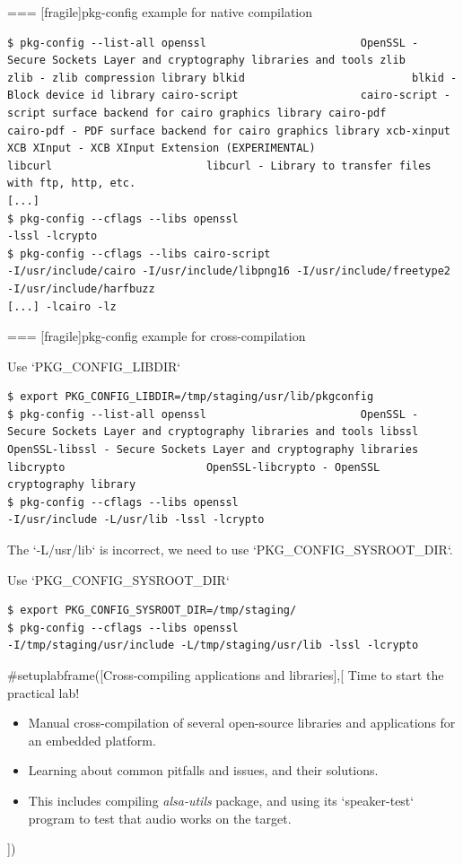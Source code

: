 === [fragile]{pkg-config example for native compilation}
  \begin{block}{}
    {\scriptsize
\begin{verbatim}
$ pkg-config --list-all openssl                        OpenSSL - Secure Sockets Layer and cryptography libraries and tools zlib                           zlib - zlib compression library blkid                          blkid - Block device id library cairo-script                   cairo-script - script surface backend for cairo graphics library cairo-pdf                      cairo-pdf - PDF surface backend for cairo graphics library xcb-xinput                     XCB XInput - XCB XInput Extension (EXPERIMENTAL)
libcurl                        libcurl - Library to transfer files with ftp, http, etc.
[...]
$ pkg-config --cflags --libs openssl
-lssl -lcrypto
$ pkg-config --cflags --libs cairo-script
-I/usr/include/cairo -I/usr/include/libpng16 -I/usr/include/freetype2 -I/usr/include/harfbuzz
[...] -lcairo -lz
\end{verbatim}
    }
  \end{block}


=== [fragile]{pkg-config example for cross-compilation}
  \begin{block}{Use `PKG_CONFIG_LIBDIR`}
    {\scriptsize
\begin{verbatim}
$ export PKG_CONFIG_LIBDIR=/tmp/staging/usr/lib/pkgconfig
$ pkg-config --list-all openssl                        OpenSSL - Secure Sockets Layer and cryptography libraries and tools libssl                         OpenSSL-libssl - Secure Sockets Layer and cryptography libraries libcrypto                      OpenSSL-libcrypto - OpenSSL cryptography library
$ pkg-config --cflags --libs openssl
-I/usr/include -L/usr/lib -lssl -lcrypto
\end{verbatim}
    }
  \end{block}

  The `-L/usr/lib` is incorrect, we need to use
  `PKG_CONFIG_SYSROOT_DIR`.

  \begin{block}{Use `PKG_CONFIG_SYSROOT_DIR`}
    {\scriptsize
\begin{verbatim}
$ export PKG_CONFIG_SYSROOT_DIR=/tmp/staging/
$ pkg-config --cflags --libs openssl
-I/tmp/staging/usr/include -L/tmp/staging/usr/lib -lssl -lcrypto
\end{verbatim}
    }
  \end{block}


#setuplabframe([Cross-compiling applications and libraries],[
  Time to start the practical lab!
  \begin{itemize}
  \item Manual cross-compilation of several open-source libraries and
    applications for an embedded platform.
  \item Learning about common pitfalls and issues, and their
    solutions.
  \item This includes compiling {\em alsa-utils} package,
    and using its `speaker-test` program to test that
    audio works on the target.
  \end{itemize}
])
